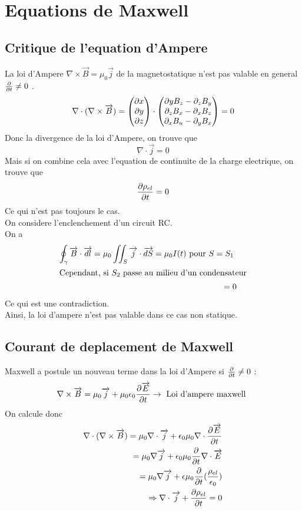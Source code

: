 \documentclass[../main.tex]{subfiles}
\begin{document}
\section{Equations de Maxwell}
\subsection{Critique de l'equation d'Ampere}
La loi d'Ampere $\nabla \times \vec{B}= \mu_0 \vec{j}$ de la magnetostatique n'est pas valable en general $ \frac{\del}{\del t}\neq 0$ .\\
\begin{align*}
	\nabla\cdot ( \nabla\times \vec{B}) = 
	\begin{pmatrix}
	\del x\\\del y\\ \del z
	\end{pmatrix} \cdot 
	\begin{pmatrix}
	\del y B_z -\del_zB_y\\\del_zB_x-\del_xB_z\\\del_xB_u-\del_yB_x
	\end{pmatrix} =0
\end{align*}
Donc la divergence de la loi d'Ampere, on trouve que
\[ 
\nabla \cdot \vec{j}=0
\]
Mais si on combine cela avec l'equation de continuite de la charge electrique, on trouve que
\[ 
\frac{\del \rho_{el} }{\del t}=0
\]
Ce qui n'est pas toujours le cas.\\
On considere l'enclenchement d'un circuit RC.\\
On a
\begin{align*}
	\oint_{\gamma} \vec{B}\cdot \vec{dl} = \mu_0 \iint_{S} \vec{j}\cdot \vec{dS} = \mu_0 I( t) \text{ pour $S=S_1$  } \\
	\intertext{Cependant, si $S_2$ passe au milieu d'un condensateur}
	=0
\end{align*}
Ce qui est une contradiction.\\
Ainsi, la loi d'ampere n'est pas valable dans ce cas non statique.
\subsection{Courant de deplacement de Maxwell}
Maxwell a postule un nouveau terme dans la loi d'Ampere si $\frac{\del }{\del t}\neq 0$ :
\begin{align*}
\nabla\times \vec{B} = \mu_0 \vec{j} + \mu_0 \epsilon_0 \frac{\del \vec{E}}{\del t} \to \text{ Loi d'ampere maxwell } 
\end{align*}
On calcule donc
\begin{align*}
\nabla \cdot ( \nabla \times \vec{B}) = \mu_0 \nabla \cdot \vec{j} + \epsilon_0 \mu_0 \nabla \cdot \frac{\del \vec{E}}{\del t}\\
= \mu_0 \nabla \vec{j} + \epsilon_0 \mu_0 \frac{\del}{\del t}\nabla \cdot \vec{E}\\
= \mu_0 \nabla \vec{j} + \epsilon \mu_0 \frac{\del }{\del t}( \frac{\rho_{el} }{\epsilon_0}) \\
\Rightarrow \nabla \cdot \vec{j} + \frac{\del \rho_{el} }{\del t}=0	
\end{align*}
\end{document}
